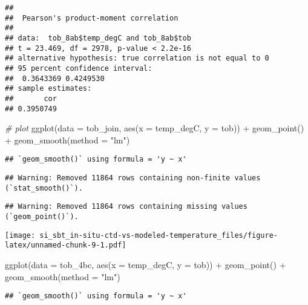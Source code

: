 \documentclass[
]{article}
\newenvironment{Shaded}{\begin{snugshade}}{\end{snugshade}}
\newcommand{\AttributeTok}[1]{\textcolor[rgb]{0.77,0.63,0.00}{#1}}
\newcommand{\CommentTok}[1]{\textcolor[rgb]{0.56,0.35,0.01}{\textit{#1}}}
\newcommand{\FunctionTok}[1]{\textcolor[rgb]{0.00,0.00,0.00}{#1}}
\newcommand{\NormalTok}[1]{#1}
\newcommand{\SpecialCharTok}[1]{\textcolor[rgb]{0.00,0.00,0.00}{#1}}
\newcommand{\StringTok}[1]{\textcolor[rgb]{0.31,0.60,0.02}{#1}}
\begin{document}
\begin{verbatim}
## 
##  Pearson's product-moment correlation
## 
## data:  tob_8ab$temp_degC and tob_8ab$tob
## t = 23.469, df = 2978, p-value < 2.2e-16
## alternative hypothesis: true correlation is not equal to 0
## 95 percent confidence interval:
##  0.3643369 0.4249530
## sample estimates:
##       cor 
## 0.3950749
\end{verbatim}

\begin{Shaded}
\begin{Highlighting}[]
\CommentTok{\# plot}
\FunctionTok{ggplot}\NormalTok{(}\AttributeTok{data =}\NormalTok{ tob\_join, }\FunctionTok{aes}\NormalTok{(}\AttributeTok{x =}\NormalTok{ temp\_degC, }\AttributeTok{y =}\NormalTok{ tob)) }\SpecialCharTok{+} \FunctionTok{geom\_point}\NormalTok{() }\SpecialCharTok{+} \FunctionTok{geom\_smooth}\NormalTok{(}\AttributeTok{method =} \StringTok{"lm"}\NormalTok{)}
\end{Highlighting}
\end{Shaded}

\begin{verbatim}
## `geom_smooth()` using formula = 'y ~ x'
\end{verbatim}

\begin{verbatim}
## Warning: Removed 11864 rows containing non-finite values (`stat_smooth()`).
\end{verbatim}

\begin{verbatim}
## Warning: Removed 11864 rows containing missing values (`geom_point()`).
\end{verbatim}

\texttt{[image: si\_sbt\_in-situ-ctd-vs-modeled-temperature\_files/figure-latex/unnamed-chunk-9-1.pdf]}

\begin{Shaded}
\begin{Highlighting}[]
\FunctionTok{ggplot}\NormalTok{(}\AttributeTok{data =}\NormalTok{ tob\_4bc, }\FunctionTok{aes}\NormalTok{(}\AttributeTok{x =}\NormalTok{ temp\_degC, }\AttributeTok{y =}\NormalTok{ tob)) }\SpecialCharTok{+} \FunctionTok{geom\_point}\NormalTok{() }\SpecialCharTok{+} \FunctionTok{geom\_smooth}\NormalTok{(}\AttributeTok{method =} \StringTok{"lm"}\NormalTok{)}
\end{Highlighting}
\end{Shaded}

\begin{verbatim}
## `geom_smooth()` using formula = 'y ~ x'
\end{verbatim}
\end{document}

